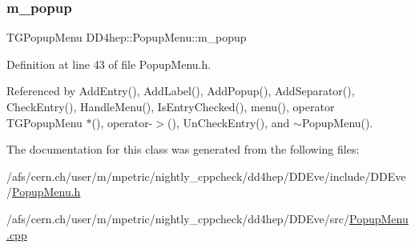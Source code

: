 \hypertarget{class_d_d4hep_1_1_popup_menu_a97937d940ef3c3d519f0ed1a5b8638ee}{}\label{class_d_d4hep_1_1_popup_menu_a97937d940ef3c3d519f0ed1a5b8638ee} 
\subsubsection{\texorpdfstring{m\+\_\+popup}{m\_popup}}
{\footnotesize\ttfamily T\+G\+Popup\+Menu D\+D4hep\+::\+Popup\+Menu\+::m\+\_\+popup\hspace{0.3cm}{\ttfamily [protected]}}



Definition at line 43 of file Popup\+Menu.\+h.



Referenced by Add\+Entry(), Add\+Label(), Add\+Popup(), Add\+Separator(), Check\+Entry(), Handle\+Menu(), Is\+Entry\+Checked(), menu(), operator T\+G\+Popup\+Menu $\ast$(), operator-\/$>$(), Un\+Check\+Entry(), and $\sim$\+Popup\+Menu().



The documentation for this class was generated from the following files\+:\begin{DoxyCompactItemize}
\item 
/afs/cern.\+ch/user/m/mpetric/nightly\+\_\+cppcheck/dd4hep/\+D\+D\+Eve/include/\+D\+D\+Eve/\hyperlink{_popup_menu_8h}{Popup\+Menu.\+h}\item 
/afs/cern.\+ch/user/m/mpetric/nightly\+\_\+cppcheck/dd4hep/\+D\+D\+Eve/src/\hyperlink{_popup_menu_8cpp}{Popup\+Menu.\+cpp}\end{DoxyCompactItemize}
